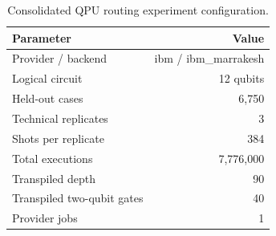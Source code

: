 \begin{table}[t]
\centering
\small
\caption{Consolidated QPU routing experiment configuration.}
\label{tab:qpu-routing-configuration}
\begin{tabular}{lr}
\toprule
Parameter & Value \\
\midrule
Provider / backend & ibm / ibm_marrakesh \\
Logical circuit & 12 qubits \\
Held-out cases & 6,750 \\
Technical replicates & 3 \\
Shots per replicate & 384 \\
Total executions & 7,776,000 \\
Transpiled depth & 90 \\
Transpiled two-qubit gates & 40 \\
Provider jobs & 1 \\
\bottomrule
\end{tabular}
\end{table}
